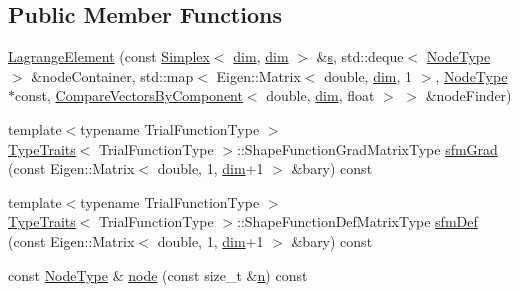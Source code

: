 \subsection*{Public Member Functions}
\begin{DoxyCompactItemize}
\item 
\hyperlink{classmodel_1_1_lagrange_element_ab8c379ee777448b1a27ff30b970a5feb}{Lagrange\+Element} (const \hyperlink{classmodel_1_1_simplex}{Simplex}$<$ \hyperlink{classmodel_1_1_lagrange_element_a56d161032b73c07c77326cfba73d731d}{dim}, \hyperlink{classmodel_1_1_lagrange_element_a56d161032b73c07c77326cfba73d731d}{dim} $>$ \&\hyperlink{_cubic_spline_intersection_8m_aec5b2c7fb98ca9f11d2c624f6d8ae9d9}{s}, std\+::deque$<$ \hyperlink{classmodel_1_1_lagrange_element_a112bda9c061442a6c52f06c61e3ab123}{Node\+Type} $>$ \&node\+Container, std\+::map$<$ Eigen\+::\+Matrix$<$ double, \hyperlink{classmodel_1_1_lagrange_element_a56d161032b73c07c77326cfba73d731d}{dim}, 1 $>$, \hyperlink{classmodel_1_1_lagrange_element_a112bda9c061442a6c52f06c61e3ab123}{Node\+Type} $\ast$const, \hyperlink{structmodel_1_1_compare_vectors_by_component}{Compare\+Vectors\+By\+Component}$<$ double, \hyperlink{classmodel_1_1_lagrange_element_a56d161032b73c07c77326cfba73d731d}{dim}, float $>$ $>$ \&node\+Finder)
\item 
{\footnotesize template$<$typename Trial\+Function\+Type $>$ }\\\hyperlink{structmodel_1_1_type_traits}{Type\+Traits}$<$ Trial\+Function\+Type $>$\+::Shape\+Function\+Grad\+Matrix\+Type \hyperlink{classmodel_1_1_lagrange_element_a64ad510877bf6c0dfc915a2bcc78f4a0}{sfm\+Grad} (const Eigen\+::\+Matrix$<$ double, 1, \hyperlink{classmodel_1_1_lagrange_element_a56d161032b73c07c77326cfba73d731d}{dim}+1 $>$ \&bary) const 
\item 
{\footnotesize template$<$typename Trial\+Function\+Type $>$ }\\\hyperlink{structmodel_1_1_type_traits}{Type\+Traits}$<$ Trial\+Function\+Type $>$\+::Shape\+Function\+Def\+Matrix\+Type \hyperlink{classmodel_1_1_lagrange_element_ac7536aee4cf79929b76a305ede35582e}{sfm\+Def} (const Eigen\+::\+Matrix$<$ double, 1, \hyperlink{classmodel_1_1_lagrange_element_a56d161032b73c07c77326cfba73d731d}{dim}+1 $>$ \&bary) const 
\item 
const \hyperlink{classmodel_1_1_lagrange_element_a112bda9c061442a6c52f06c61e3ab123}{Node\+Type} \& \hyperlink{classmodel_1_1_lagrange_element_a7f53d6f433eb593f9ca55c1ab5d04e72}{node} (const size\+\_\+t \&\hyperlink{_f_e_m_2linear__elasticity__3d_2tetgen_2generate_p_o_l_ycube_8m_a74637fc31d6aedd6d61cdc0c8154bc13}{n}) const 

\end{DoxyCompactItemize}
